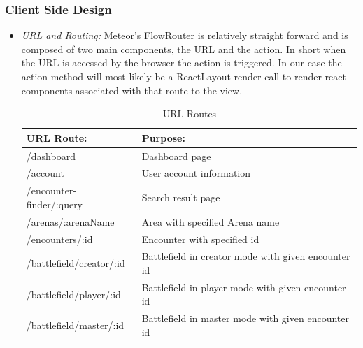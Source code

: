 \documentclass[letterpaper, 10 pt, conference]{ieeeconf}
\begin{document}
\subsubsection{Client Side Design}
\begin{itemize}
	\item \textit{URL and Routing:} Meteor's FlowRouter is relatively straight forward and is composed of two main components,
	the URL and the action. In short when the URL is accessed by the
	browser the action is triggered. In our case the action method will most likely be
	a ReactLayout render call to render react components associated with that route
	to the view.
		\begin{table}[H]
		\begin{center}
			\begin{tabular}{ |p{2.5cm}|p{4cm}| } 
				\hline
				URL Route: & Purpose: \\
				\hline
				/dashboard & Dashboard page \\
				/account & User account information\\
				/encounter-finder/:query & Search result page  \\
				/arenas/:arenaName & Area with specified Arena name  \\
				/encounters/:id & Encounter with specified id \\
				/battlefield/creator/:id & Battlefield in creator mode with given encounter id \\
				/battlefield/player/:id & Battlefield in player mode with given encounter id \\
				/battlefield/master/:id & Battlefield in master mode with given encounter id \\	
				\hline
			\end{tabular}
		\end{center}
		\caption{URL Routes} \label{fig: URL Routes}
	\end{table}
\end{itemize}
\end{document}
